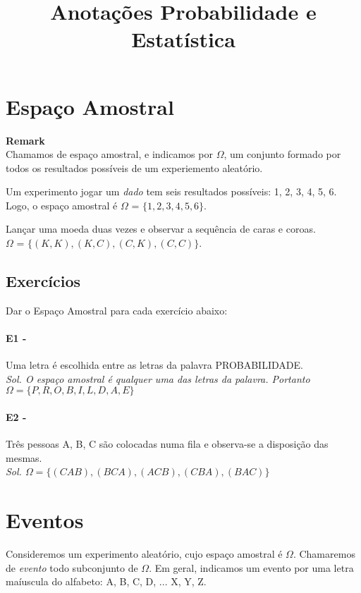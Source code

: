 \documentclass[10pt,a4paper]{article}
\title{Anotações Probabilidade e Estatística}
\begin{document}
\maketitle
\small
\section{Espaço Amostral}
\begin{mdframed}[linewidth=0.6pt]
\textbf{Remark}\\
	Chamamos de espaço amostral, e indicamos por $\Omega$, um conjunto formado por todos os
	resultados possíveis de um experiemento aleatório.
\end{mdframed}

\begin{eg}
	Um experimento jogar um \textit{dado} tem seis resultados possíveis: 1, 2, 3, 4, 5, 6. Logo, o espaço amostral é $\Omega$ = $\lbrace1, 2, 3, 4, 5, 6\rbrace$.
\end{eg}
\begin{eg} 
	Lançar uma moeda duas vezes e observar a sequência de caras e coroas.\\
	$\Omega$ = $\lbrace (K,K), (K,C), (C,K), (C,C)\rbrace$.
\end{eg}

\subsection{Exercícios}
Dar o Espaço Amostral para cada exercício abaixo:\\
\paragraph{E1 - }Uma letra é escolhida entre as letras da palavra PROBABILIDADE.\\
\textit{Sol. O espaço amostral é qualquer uma das letras da palavra. Portanto \\
$\Omega = \lbrace P, R, O, B, I, L, D, A, E \rbrace$}

\paragraph{E2 - }Três pessoas A, B, C são colocadas numa fila e observa-se a disposição das mesmas.\\
\textit{Sol. $\Omega = \lbrace (CAB), (BCA), (ACB), (CBA), (BAC) \rbrace$}

\section{Eventos}
Consideremos um experimento aleatório, cujo espaço amostral é $\Omega$. Chamaremos de \textit{evento} todo subconjunto de $\Omega$. Em geral, indicamos um evento por uma letra maíuscula do alfabeto: A, B, C, D, ... X, Y, Z.
\end{document}
